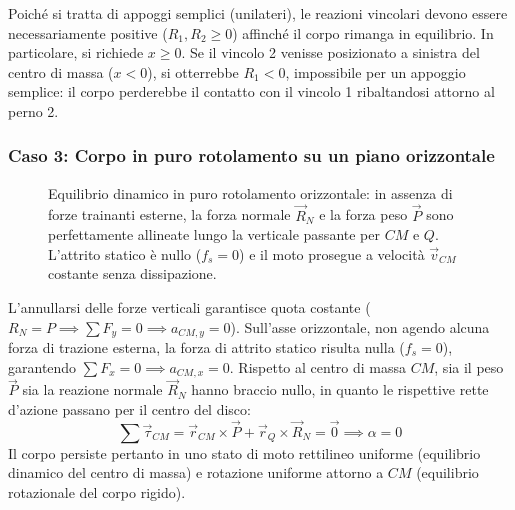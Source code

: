 Poiché si tratta di appoggi semplici (unilateri), le reazioni vincolari devono essere necessariamente positive ($R_1, R_2 \ge 0$) affinché il corpo rimanga in equilibrio. In particolare, si richiede $x \ge 0$. Se il vincolo 2 venisse posizionato a sinistra del centro di massa ($x < 0$), si otterrebbe $R_1 < 0$, impossibile per un appoggio semplice: il corpo perderebbe il contatto con il vincolo 1 ribaltandosi attorno al perno 2.

\subsubsection{Caso 3: Corpo in puro rotolamento su un piano orizzontale}
\begin{figure}[ht]
\centering
{}
\caption{Equilibrio dinamico in puro rotolamento orizzontale: in assenza di forze trainanti esterne, la forza normale $\vec{R}_N$ e la forza peso $\vec{P}$ sono perfettamente allineate lungo la verticale passante per $CM$ e $Q$. L'attrito statico è nullo ($f_s = 0$) e il moto prosegue a velocità $\vec{v}_{CM}$ costante senza dissipazione.}
\end{figure}

L'annullarsi delle forze verticali garantisce quota costante ($R_N = P \implies \sum F_y = 0 \implies a_{CM, y} = 0$). Sull'asse orizzontale, non agendo alcuna forza di trazione esterna, la forza di attrito statico risulta nulla ($f_s = 0$), garantendo $\sum F_x = 0 \implies a_{CM, x} = 0$.
Rispetto al centro di massa $CM$, sia il peso $\vec{P}$ sia la reazione normale $\vec{R}_N$ hanno braccio nullo, in quanto le rispettive rette d'azione passano per il centro del disco:
\begin{equation}
    \sum \vec{\tau}_{CM} = \vec{r}_{CM} \times \vec{P} + \vec{r}_Q \times \vec{R}_N = \vec{0} \implies \alpha = 0
\end{equation}
Il corpo persiste pertanto in uno stato di moto rettilineo uniforme (equilibrio dinamico del centro di massa) e rotazione uniforme attorno a $CM$ (equilibrio rotazionale del corpo rigido).

